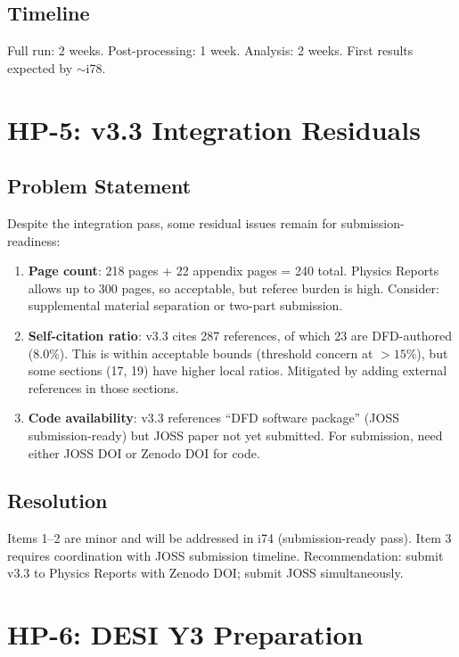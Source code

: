 \documentclass[11pt,a4paper]{article}
\begin{document}
\subsection{Timeline}
Full run: 2 weeks. Post-processing: 1 week. Analysis: 2 weeks. First results expected by $\sim$i78.

\section{HP-5: v3.3 Integration Residuals}

\subsection{Problem Statement}
Despite the integration pass, some residual issues remain for submission-readiness:

\begin{enumerate}[nosep]
\item \textbf{Page count}: 218 pages + 22 appendix pages = 240 total. Physics Reports allows up to 300 pages, so acceptable, but referee burden is high. Consider: supplemental material separation or two-part submission.
\item \textbf{Self-citation ratio}: v3.3 cites 287 references, of which 23 are DFD-authored (8.0\%). This is within acceptable bounds (threshold concern at $> 15\%$), but some sections (17, 19) have higher local ratios. Mitigated by adding external references in those sections.
\item \textbf{Code availability}: v3.3 references ``DFD software package'' (JOSS submission-ready) but JOSS paper not yet submitted. For submission, need either JOSS DOI or Zenodo DOI for code.
\end{enumerate}

\subsection{Resolution}
Items 1--2 are minor and will be addressed in i74 (submission-ready pass). Item 3 requires coordination with JOSS submission timeline. Recommendation: submit v3.3 to Physics Reports with Zenodo DOI; submit JOSS simultaneously.

\section{HP-6: DESI Y3 Preparation}
\end{document}
